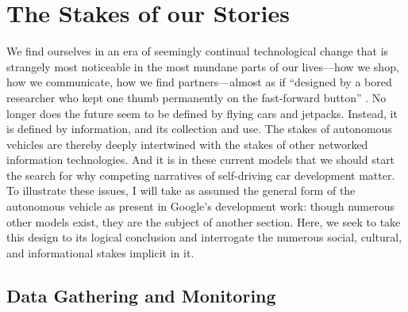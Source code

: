 \chapter{The Stakes of our Stories}
\label{chap:2}











We find ourselves in an era of seemingly continual technological
change that is strangely most noticeable in the most mundane parts of
our lives---how we shop, how we communicate, how we find
partners---almost as if ``designed by a bored researcher who kept one
thumb permanently on the fast-forward button'' \cite[p.
  7]{Neuromancer1984}. No longer does the future seem to be
defined by flying cars and jetpacks. Instead, it is defined by
information, and its collection and use. The stakes of autonomous
vehicles are thereby deeply intertwined with the
stakes of other networked information technologies. And it is in these
current models that we should start the search for why competing
narratives of self-driving car development matter. To illustrate these
issues, I will
take as assumed the general form of the autonomous vehicle as present
in Google's development work: though numerous other models exist, they
are the subject of another section. Here, we seek to take this design
to its logical conclusion and interrogate the numerous social,
cultural, and informational stakes implicit in it.


\section{Data Gathering and Monitoring} 

